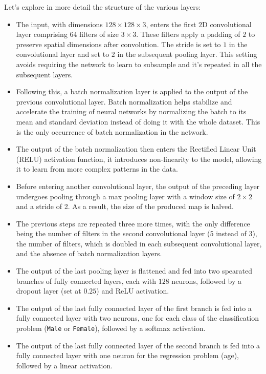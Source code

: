 Let's explore in more detail the structure of the various layers:
\begin{itemize}
    \item The input, with dimensions $128\times128\times3$, enters
    the first $2$D convolutional layer comprising $64$ filters of size $3\times3$.
    These filters apply a padding of $2$ to preserve spatial dimensions
    after convolution. The stride is set to $1$
    in the convolutional layer and set to $2$ in the subsequent 
    pooling layer. This setting avoids requiring the network to learn
    to subsample and it's repeated in all the subsequent layers.
    \item Following this, a batch normalization layer is applied
    to the output of the previous convolutional layer.
    Batch normalization helps stabilize and accelerate
    the training of neural networks by normalizing the batch to its
    mean and standard deviation instead of doing it with the whole dataset.
    This is the only occurrence of batch normalization in the network.
    \item The output of the batch normalization then enters
    the Rectified Linear Unit (RELU) activation function,
    it introduces non-linearity to the model,
    allowing it to learn from more complex patterns in the data.
    \item Before entering another convolutional layer,
    the output of the preceding layer undergoes pooling through
    a max pooling layer with a window size of $2\times2$ and a stride of 2.
    As a result, the size of the produced map is halved.
    \item The previous steps are repeated three more times,
    with the only difference being the number of filters in the
    second convolutional layer (5 instead of 3), the number of filters,
    which is doubled in each subsequent convolutional layer,
    and the absence of batch normalization layers.
    \item The output of the last pooling layer is flattened
    and fed into two spearated branches of fully connected layers,
    each with $128$ neurons,
    followed by a dropout layer (set at $0.25$) and ReLU activation.
    \item The output of the last fully connected layer of the first branch
    is fed into a fully connected layer with two neurons,
    one for each class of the classification problem
    (\texttt{Male} or \texttt{Female}), followed by a softmax activation.
    \item The output of the last fully connected layer of the second branch
    is fed into a fully connected layer with one neuron
    for the regression problem (age), followed by a linear activation.
\end{itemize}

